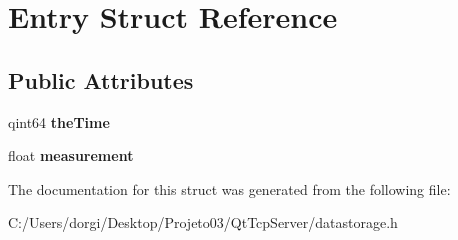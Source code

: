 \hypertarget{struct_entry}{}\section{Entry Struct Reference}
\label{struct_entry}
\subsection*{Public Attributes}
\begin{DoxyCompactItemize}
\item 
\mbox{\label{struct_entry_a0a78d616ccc342ef6c34d849288d7c85}} 
qint64 {\bfseries the\+Time}
\item 
\mbox{\label{struct_entry_a78ebc6241b1baaa2551b2cf89f519960}} 
float {\bfseries measurement}
\end{DoxyCompactItemize}


The documentation for this struct was generated from the following file\+:\begin{DoxyCompactItemize}
\item 
C\+:/\+Users/dorgi/\+Desktop/\+Projeto03/\+Qt\+Tcp\+Server/datastorage.\+h\end{DoxyCompactItemize}
